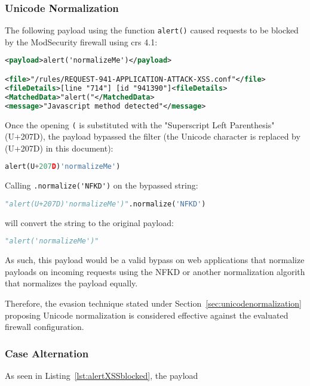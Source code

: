 \subsubsection{Unicode Normalization}
\label{sec:uninormsingleiter}
The following payload using the function \verb|alert()| caused requests to be blocked by the ModSecurity firewall using \acrshort{crs} 4.1:

\begin{lstlisting}[style=ruleStyle, language=XML, caption=alert('normalizeMe') blocked]
<payload>alert('normalizeMe')</payload>

<file>"/rules/REQUEST-941-APPLICATION-ATTACK-XSS.conf"</file>
<fileDetails>[line "714"] [id "941390"]<fileDetails>
<MatchedData>"alert("</MatchedData>
<message>"Javascript method detected"</message>
\end{lstlisting}

Once the opening \verb|(| is substituted with the "Superscript Left Parenthesis" (U+207D), the payload bypassed the filter (the Unicode character is replaced by (U+207D) in this document):

\begin{lstlisting}[style=basicStyle, caption=alert(U+207D)'normalizeMe') bypass, label=lst:alertnormalizemebypass, language=Python]
alert(U+207D)'normalizeMe')
\end{lstlisting}
Calling \verb|.normalize('NFKD')| on the bypassed string:

\begin{lstlisting}[style=basicStyle, language=Python]
"alert(U+207D)'normalizeMe')".normalize('NFKD')
\end{lstlisting}
will convert the string to the original payload:

\begin{lstlisting}[style=basicStyle, language=Python]
"alert('normalizeMe')"
\end{lstlisting}
As such, this payload would be a valid bypass on web applications that normalize payloads on incoming requests using the NFKD or another normalization algorith that normalizes the payload equally. 

Therefore, the evasion technique stated under Section~\ref{sec:unicodenormalization} proposing Unicode normalization is considered effective against the evaluated firewall configuration.


\subsubsection{Case Alternation}
\label{sec:casealternationevaluation}
As seen in Listing~\ref{lst:alertXSSblocked}, the payload 

